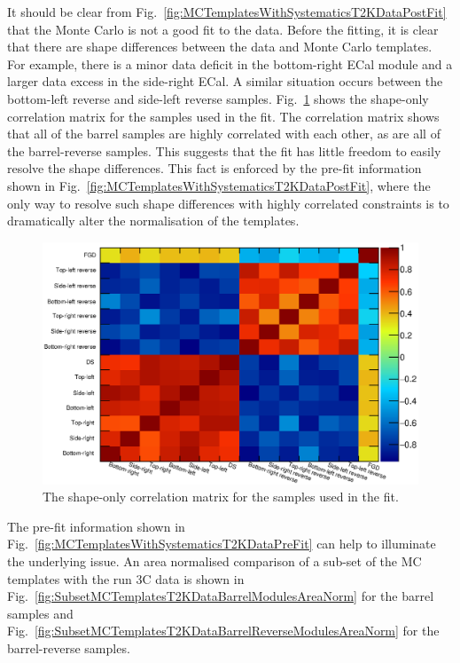 \newline
\newline
It should be clear from Fig.~\ref{fig:MCTemplatesWithSystematicsT2KDataPostFit} that the Monte Carlo is not a good fit to the data.  Before the fitting, it is clear that there are shape differences between the data and Monte Carlo templates.  For example, there is a minor data deficit in the bottom-right ECal module and a larger data excess in the side-right ECal.  A similar situation occurs between the bottom-left reverse and side-left reverse samples.  Fig.~\ref{fig:ShapeCorrelationMatrix} shows the shape-only correlation matrix for the samples used in the fit.  The correlation matrix shows that all of the barrel samples are highly correlated with each other, as are all of the barrel-reverse samples.  This suggests that the fit has little freedom to easily resolve the shape differences.  This fact is enforced by the pre-fit information shown in Fig.~\ref{fig:MCTemplatesWithSystematicsT2KDataPostFit}, where the only way to resolve such shape differences with highly correlated constraints is to dramatically alter the normalisation of the templates. 
\begin{figure}
  \centering
  \includegraphics[width=15cm]{images/measurement/data/ShapeCorrelationMatrix.eps}
  \caption{The shape-only correlation matrix for the samples used in the fit.}
  \label{fig:ShapeCorrelationMatrix}
\end{figure}
The pre-fit information shown in Fig.~\ref{fig:MCTemplatesWithSystematicsT2KDataPreFit} can help to illuminate the underlying issue.  An area normalised comparison of a sub-set of the MC templates with the run 3C data is shown in Fig.~\ref{fig:SubsetMCTemplatesT2KDataBarrelModulesAreaNorm} for the barrel samples and Fig.~\ref{fig:SubsetMCTemplatesT2KDataBarrelReverseModulesAreaNorm} for the barrel-reverse samples.  
